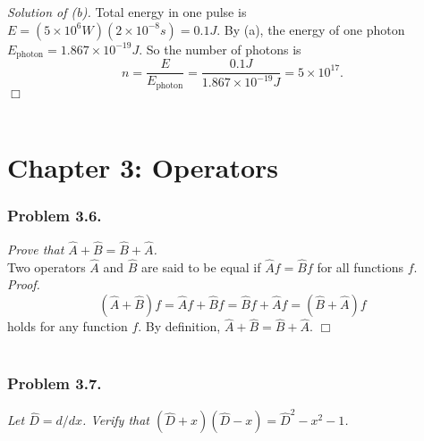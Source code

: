 \documentclass{article}
\begin{document}
\emph{Solution of (b).}
Total energy in one pulse is $E = (5 \times 10^6 W)(2 \times 10^{-8}s) = 0.1J$.
By (a), the energy of one photon $E_{\text{photon}} = 1.867 \times 10^{-19} J$.
So the number of photons is
$$n = \frac{E}{E_{\text{photon}}}
= \frac{0.1J}{1.867 \times 10^{-19} J}
= 5 \times 10^{17}.$$
$\Box$ \\\\






\newpage
\section*{Chapter 3: Operators \\}



\subsubsection*{Problem 3.6.}
\emph{Prove that $\hat{A} + \hat{B} = \hat{B} + \hat{A}$. } \\

Two operators $\hat{A}$ and $\hat{B}$ are said to be equal if
$\hat{A}f = \hat{B}f$ for all functions $f$. \\

\emph{Proof.}
$$(\hat{A} + \hat{B})f = \hat{A}f + \hat{B}f
= \hat{B}f + \hat{A}f = (\hat{B} + \hat{A})f$$
holds for any function $f$.
By definition,
$\hat{A} + \hat{B} = \hat{B} + \hat{A}$.
$\Box$ \\\\






\subsubsection*{Problem 3.7.}
\emph{Let $\hat{D} = d/dx$.
Verify that $(\hat{D}+x)(\hat{D}-x) = \hat{D}^2-x^2-1$. } \\
\end{document}
